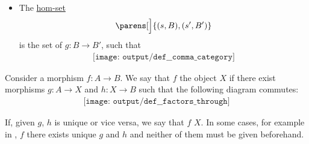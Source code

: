 \begin{definition}
\begin{thmenum}
\begin{minipage}[t]{0.43\textwidth}
\begin{itemize}
        \item The \hyperref[def:category/morphisms]{hom-set}
        \begin{equation*}
          [X \downarrow G]\parens[\Big]{ (s, B), (s', B') }
        \end{equation*}
        is the set of \( g: B \to B' \), such that
        \begin{equation}\label{eq:def:comma_category/fixed/left}
          \begin{aligned}
            \texttt{[image: output/def\_\_comma\_category]}
          \end{aligned}
        \end{equation}
      \end{itemize}
    \end{minipage}
  \end{thmenum}
\end{definition}

\begin{definition}\label{def:factors_through}
  Consider a morphism \( f: A \to B \). We say that \( f \)  the object \( X \) if there exist morphisms \( g: A \to X \) and \( h: X \to B \) such that the following diagram commutes:
  \begin{equation}\label{eq:def:factors_through}
    \begin{aligned}
      \texttt{[image: output/def\_\_factors\_through]}
    \end{aligned}
  \end{equation}

  If, given \( g \), \( h \) is unique or vice versa, we say that \( f \)  \( X \). In some cases, for example in , \( f \) there exists unique \( g \) and \( h \) and neither of them must be given beforehand.
\end{definition}

